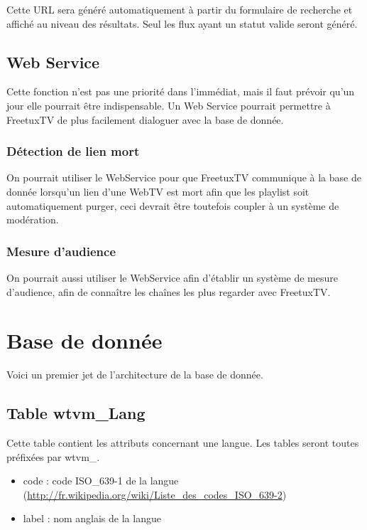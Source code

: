\documentclass[10pt,a4paper]{article}
\begin{document}
Cette URL sera généré automatiquement à partir du formulaire de recherche et affiché au niveau des résultats. Seul les flux ayant un statut valide seront généré.

\subsection{Web Service}

Cette fonction n'est pas une priorité dans l'immédiat, mais il faut prévoir qu'un jour elle pourrait être indispensable. Un Web Service pourrait permettre à FreetuxTV de plus facilement dialoguer avec la base de donnée.

\subsubsection{Détection de lien mort}

On pourrait utiliser le WebService pour que FreetuxTV communique à la base de donnée lorsqu'un lien d'une WebTV est mort afin que les playlist soit automatiquement purger, ceci devrait être toutefois coupler à un système de modération.

\subsubsection{Mesure d'audience}

On pourrait aussi utiliser le WebService afin d'établir un système de mesure d'audience, afin de connaître les chaînes les plus regarder avec FreetuxTV.

\section{Base de donnée}

Voici un premier jet de l'architecture de la base de donnée.

\subsection{Table wtvm\_Lang}

Cette table contient les attributs concernant une langue. Les tables seront toutes préfixées par wtvm\_.

\begin{itemize}
\item code : code ISO\_639-1 de la langue (\url{http://fr.wikipedia.org/wiki/Liste\_des\_codes\_ISO\_639-2})
\item label : nom anglais de la langue
\end{itemize}
\end{document}
